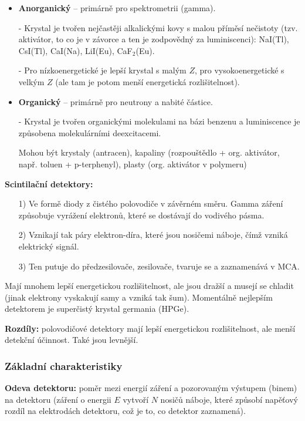 \begin{itemize}
    \item \textbf{Anorganický} -- primárně pro spektrometrii (gamma). 
    \item[-] Krystal je tvořen nejčastěji alkalickými kovy s malou příměsí nečistoty (tzv. aktivátor, to co je v závorce a ten je zodpovědný za luminiscenci): NaI(Tl), CsI(Tl), CaI(Na), LiI(Eu), CaF$_2$(Eu). 
    \item[-] Pro nízkoenergetické je lepší krystal s malým $Z$, pro vysokoenergetické s velkým $Z$ (ale tam je potom menší energetická rozlišitelnost).  
    \item \textbf{Organický} -- primárně pro neutrony a nabité částice.
    \item[-] Krystal je tvořen organickými molekulami na bázi benzenu a luminiscence je způsobena molekulárními deexcitacemi.
    \item[] Mohou být krystaly (antracen), kapaliny (rozpouštědlo + org. aktivátor, např. toluen + p-terphenyl), plasty (org. aktivátor v polymeru)
\end{itemize}

\textbf{Scintilační detektory:}

\begin{itemize}
    \item[1)] Ve formě diody z čistého polovodiče v závěrném směru. Gamma záření způsobuje vyrážení elektronů, které se dostávají do vodivého pásma.
    \item[2)] Vznikají tak páry elektron-díra, které jsou nosičemi náboje, čímž vzniká elektrický signál.
    \item[3)] Ten putuje do předzesilovače, zesilovače, tvaruje se a zaznamenává v MCA.
\end{itemize}

Mají mnohem lepší energetickou rozlišitelnost, ale jsou dražší a musejí se chladit (jinak elektrony vyskakují samy a vzniká tak šum). Momentálně nejlepším detektorem je superčistý krystal germania (HPGe).

\textbf{Rozdíly:} polovodičové detektory mají lepší energetickou rozlišitelnost, ale menší detekční účinnost. Také jsou levnější.

\subsubsection{Základní charakteristiky}

\textbf{Odeva detektoru:} poměr mezi energií záření a pozorovaným výstupem (binem) na detektoru (záření o energii $E$ vytvoří $N$ nosičů náboje, které způsobí napěťový rozdíl na elektrodách detektoru, což je to, co detektor zaznamená).

